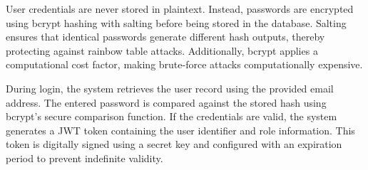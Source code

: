 User credentials are never stored in plaintext. Instead, passwords are encrypted using bcrypt hashing with salting before being stored in the database. Salting ensures that identical passwords generate different hash outputs, thereby protecting against rainbow table attacks. Additionally, bcrypt applies a computational cost factor, making brute-force attacks computationally expensive.

During login, the system retrieves the user record using the provided email address. The entered password is compared against the stored hash using bcrypt's secure comparison function. If the credentials are valid, the system generates a JWT token containing the user identifier and role information. This token is digitally signed using a secret key and configured with an expiration period to prevent indefinite validity.

